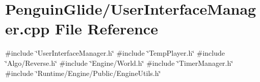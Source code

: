 \section{Penguin\+Glide/\+User\+Interface\+Manager.cpp File Reference}
\label{_user_interface_manager_8cpp}
{\ttfamily \#include \char`\"{}User\+Interface\+Manager.\+h\char`\"{}}\newline
{\ttfamily \#include \char`\"{}Temp\+Player.\+h\char`\"{}}\newline
{\ttfamily \#include \char`\"{}Algo/\+Reverse.\+h\char`\"{}}\newline
{\ttfamily \#include \char`\"{}Engine/\+World.\+h\char`\"{}}\newline
{\ttfamily \#include \char`\"{}Timer\+Manager.\+h\char`\"{}}\newline
{\ttfamily \#include \char`\"{}Runtime/\+Engine/\+Public/\+Engine\+Utils.\+h\char`\"{}}\newline
